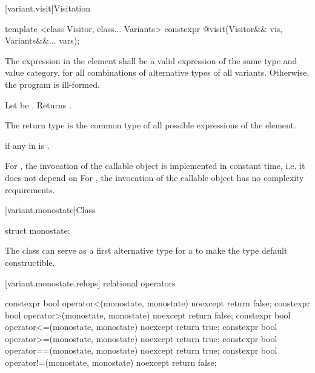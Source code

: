 [variant.visit]{Visitation}

%
%
\begin{itemdecl}
template <class Visitor, class... Variants>
  constexpr @\seebelow@ visit(Visitor&& vis, Variants&&... vars);
\end{itemdecl}

\begin{itemdescr}
\pnum
\requires
The expression in the \effects element shall be a valid expression of the same
 type and value category, for all combinations of alternative types of all
 variants. Otherwise, the program is ill-formed.

\pnum
\effects
Let  be . Returns \brk{}
.

\pnum
\remarks
The return type is the common type of all possible 
expressions of the \effects element.

\pnum
\throws
{} if any  in  is .

\pnum
\complexity
For , the invocation of the callable object is
implemented in constant time, i.e. it does not depend on 
For , the invocation of the callable object has
no complexity requirements.
\end{itemdescr}

%
[variant.monostate]{Class }

\begin{itemdecl}
struct monostate{};
\end{itemdecl}

\begin{itemdescr}
\pnum
The class  can serve as a first alternative type for
a  to make the  type default constructible.
\end{itemdescr}


[variant.monostate.relops]{ relational operators}

%
%
%
%
%
%
\begin{itemdecl}
constexpr bool operator<(monostate, monostate) noexcept { return false; }
constexpr bool operator>(monostate, monostate) noexcept { return false; }
constexpr bool operator<=(monostate, monostate) noexcept { return true; }
constexpr bool operator>=(monostate, monostate) noexcept { return true; }
constexpr bool operator==(monostate, monostate) noexcept { return true; }
constexpr bool operator!=(monostate, monostate) noexcept { return false; }
\end{itemdecl}

